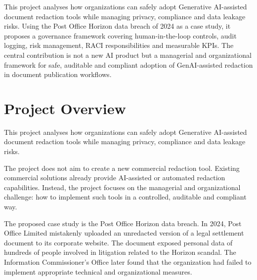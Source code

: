 \documentclass[12pt,a4paper]{article}
\begin{document}
\thispagestyle{empty}
\vspace*{2cm}
\begin{tcolorbox}[
  enhanced,
  colback=accentlight!30!white,
  colframe=accentdark,
  coltitle=white,
  fonttitle=\bfseries\large,
  title=Abstract,
  attach boxed title to top center={yshift=-3mm},
  boxed title style={colback=accentdark, arc=3pt, boxrule=0pt},
  arc=3pt,
  boxrule=0.8pt,
  left=12pt, right=12pt, top=10pt, bottom=10pt,
]
This project analyses how organizations can safely adopt Generative AI-assisted document redaction tools while managing privacy, compliance and data leakage risks. Using the Post Office Horizon data breach of 2024 as a case study, it proposes a governance framework covering human-in-the-loop controls, audit logging, risk management, RACI responsibilities and measurable KPIs. The central contribution is not a new AI product but a managerial and organizational framework for safe, auditable and compliant adoption of GenAI-assisted redaction in document publication workflows.
\end{tcolorbox}

\newpage
\tableofcontents
\newpage

\section{Project Overview}

This project analyses how organizations can safely adopt Generative AI-assisted document redaction tools while managing privacy, compliance and data leakage risks.

The project does not aim to create a new commercial redaction tool. Existing commercial solutions already provide AI-assisted or automated redaction capabilities. Instead, the project focuses on the managerial and organizational challenge: how to implement such tools in a controlled, auditable and compliant way.

The proposed case study is the Post Office Horizon data breach. In 2024, Post Office Limited mistakenly uploaded an unredacted version of a legal settlement document to its corporate website. The document exposed personal data of hundreds of people involved in litigation related to the Horizon scandal. The Information Commissioner's Office later found that the organization had failed to implement appropriate technical and organizational measures.
\end{document}
